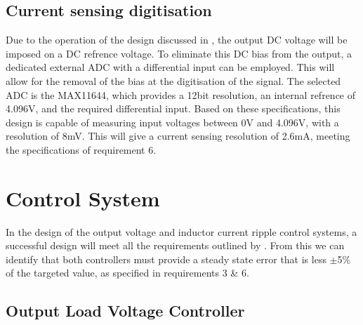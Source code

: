 
\subsection*{Current sensing digitisation}\label{S:current_sense_ADC_design}

Due to the operation of the design discussed in , the output DC voltage will be imposed on a DC refrence voltage. To eliminate this DC bias from the output, a dedicated external ADC with a differential input can be employed. This will allow for the removal of the bias at the digitisation of the signal. The selected ADC is the MAX11644, which provides a 12bit resolution, an internal refrence of 4.096V, and the required differential input. 
Based on these specifications, this design is capable of measuring input voltages between 0V and 4.096V, with a resolution of 8mV. This will give a current sensing resolution of 2.6mA, meeting the specifications of requirement 6.




%
%

\section{Control System}\label{S:control_design}

In the design of the output voltage and inductor current ripple control systems, a successful design will meet all the requirements outlined by . From this we can identify that both controllers must provide a steady state error that is less $\pm$5\% of the targeted value, as specified in requirements 3 \& 6. 

\subsection{Output Load Voltage Controller}\label{S:output_control_design}

